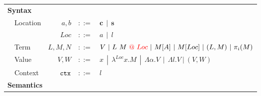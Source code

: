 \documentclass[a4paper]{article}
\makeatletter
\theoremstyle{plain}
\theoremstyle{definition}
\newcommand{\ruleverticalsep}{0.5cm}
\newcommand{\client}{\textbf{c}}
\newcommand{\server}{\textbf{s}}
\newcommand{\Loc}{Loc}
\newcommand{\at}[1]{@#1}
\newcommand{\eff}{\mbox{\texttt{ctx}}}
\makeatother
\begin{document}
\begin{figure}[h]
\centering
\begin{tabular}{ l  l  r  c  l }
\multicolumn{5}{l}{\textbf{Syntax}} \\
 & Location & $a,b$   & $::=$ & $\client \ \ | \  \  \server$ \\
 &          & $\Loc$  & $::=$  & $a  \ \ |  \ \ l$ \\
 & Term     & $L,M,N$ & $::=$  & $V  \ | \  L \ M \ {\color{red}\at{\ \Loc}} \ | \  M[A]  \ | \  M[\Loc]  \ | \  (L,M)  \ |  \ \pi_i(M)$ \\
 & Value & $V,W$ & $::=$ & $x  \ \ |  \ \ \lambda^{Loc} x.M  \ \ |  \ \ \Lambda\alpha.V  \ \ |  \ \ \Lambda l.V \ | \ (V,W)$ \\
 & Context  & $\eff$  & $::=$ & $l$ \\[\ruleverticalsep]
\multicolumn{5}{l}{\textbf{Semantics}} \\
\end{tabular}


\end{figure}
\end{document}
